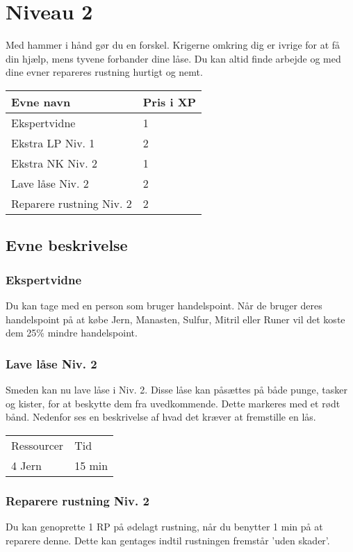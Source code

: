 \chapter{Niveau 2}
Med hammer i hånd gør du en forskel. Krigerne omkring dig er ivrige for at få din hjælp, mens tyvene forbander dine låse. Du kan altid finde arbejde og med dine evner repareres rustning hurtigt og nemt.
\begin{table}[H]
    \centering
    \begin{tabular}{|p{}|p{}|}
    \rowcolor{cerulean!80}\hline
    Evne navn & Pris i XP \\\hline
    Ekspertvidne & 1 \\\hline
    Ekstra LP Niv. 1 & 2\\\hline
    Ekstra NK Niv. 2 & 1\\\hline
    Lave låse Niv. 2 & 2\\\hline
    Reparere rustning Niv. 2 & 2\\\hline
    \end{tabular}
\end{table}
\section{Evne beskrivelse}

\subsection{Ekspertvidne}
Du kan tage med en person som bruger handelspoint. Når de bruger deres handelspoint på at købe Jern, Manasten, Sulfur, Mitril eller Runer vil det koste dem 25\% mindre handelspoint.




\subsection{Lave låse Niv. 2}
Smeden kan nu lave låse i Niv. 2. Disse låse kan påsættes på både punge, tasker og kister, for at beskytte dem fra uvedkommende. Dette markeres med et rødt bånd. Nedenfor ses en beskrivelse af hvad det kræver at fremstille en lås.\\

\begin{table}[H]
    \centering
    \begin{tabular}{|p{}|p{}|}
    \hline
    \rowcolor{cerulean!80}
    \multicolumn{2}{c}{Lås Niv. 2}\\
    \hline
    \rowcolor{cerulean!40}
         Ressourcer & Tid \\\hline
         4 Jern & 15 min\\\hline
    \end{tabular}
    \end{table}
    
\subsection{Reparere rustning Niv. 2}
Du kan genoprette 1 RP på ødelagt rustning, når du benytter 1 min på at reparere denne. Dette kan gentages indtil rustningen fremstår 'uden skader'.\\

